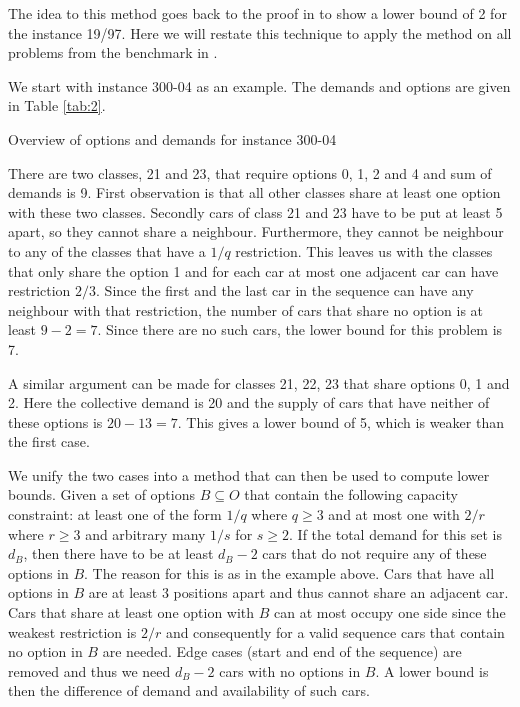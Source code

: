 \documentclass[]{llncs}
\begin{document}
The idea to this method goes back to the proof in \cite{Gent98} to show a lower bound of 2 for the instance 19/97. Here
we will restate this technique to apply the method on all problems from the benchmark in \cite{Gravel05}. 

We start with instance 300-04 as an example. The demands and options are given in Table \ref{tab:2}. 

\begin{table}[htbp]
    \caption{Overview of options and demands for instance 300-04}
    \centering
    
    \label{tab:2}
\end{table}

There are two classes, 21 and 23, that require options 0, 1, 2 and 4 and sum of demands is 9. First observation is that
all other classes share at least one option with these two classes.  Secondly cars of class 21 and 23 have to be put at
least 5 apart, so they cannot share a neighbour. Furthermore, they cannot be neighbour to any of the classes that have a
$1/q$ restriction. This leaves us with the classes that only share the option 1 and for each car at most one adjacent
car can have restriction $2/3$. Since the first and the last car in the sequence can have any neighbour with that
restriction, the number of cars that share no option is at least $9-2=7$. Since there are no such cars, the lower bound
for this problem is 7. 

A similar argument can be made for classes 21, 22, 23 that share options 0, 1 and 2. Here the collective demand is 20
and the supply of cars that have neither of these options is $20 - 13 = 7$. This gives a lower bound of 5, which is
weaker than the first case. 

We unify the two cases into a method that can then be used to compute lower bounds. Given a set of options $B\subseteq
O$ that contain the following capacity constraint: at least one of the form $1/q$ where $q \geq 3$ and at most one with
$2/r$ where $r \geq 3$ and arbitrary many $1/s$ for $s \geq 2$. If the total demand for this set is $d_B$, then there
have to be at least $d_B-2$ cars that do not require any of these options in $B$. The reason for this is as in the
example above. Cars that have all options in $B$ are at least 3 positions apart and thus cannot share an adjacent car.
Cars that share at least one option with $B$ can at most occupy one side since the weakest restriction is $2/r$ and
consequently for a valid sequence cars that contain no option in $B$ are needed. Edge cases (start and end of the
sequence) are removed and thus we need $d_B-2$ cars with no options in $B$. A lower bound is then the difference of
demand and availability of such cars. 
\end{document}
